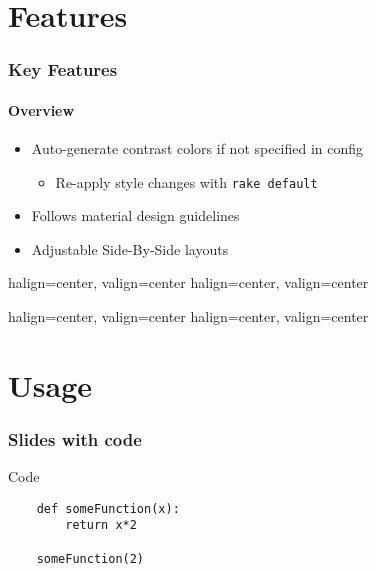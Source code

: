 \documentclass{beamer}
\begin{document}
\section{Features}
\begin{frame}
	\frametitle{Key Features}
	\framesubtitle{Overview}

	\begin{itemize}
		\item Auto-generate contrast colors if not specified in config
		\begin{itemize}
			\item Re-apply style changes with \texttt{rake default}
		\end{itemize}
		\item Follows material design guidelines
		\item Adjustable Side-By-Side layouts
	\end{itemize}
\end{frame}

\begin{frame}
	{halign=center, valign=center}
	{halign=center, valign=center}
\end{frame}

\begin{frame}
	{halign=center, valign=center}
	{halign=center, valign=center}
\end{frame}


\section{Usage}
\subsubsection{Slides with code}
\begin{frame}[fragile=singleslide]{Code}
	\begin{lstlisting}
	def someFunction(x):
		return x*2

	someFunction(2)
	\end{lstlisting}
\end{frame}
\end{document}
